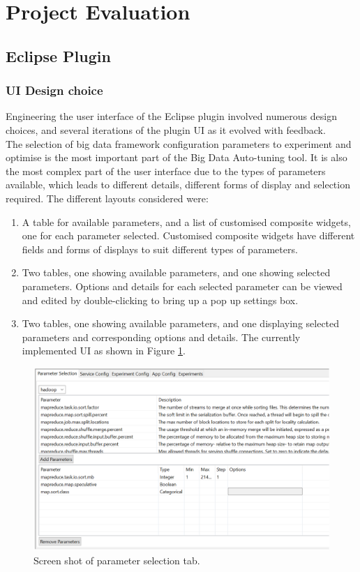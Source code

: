 \newpage
\section{Project Evaluation}
\subsection{Eclipse Plugin}
\subsubsection{UI Design choice}
Engineering the user interface of the Eclipse plugin involved numerous design choices, and several iterations of the plugin UI as it evolved with feedback.\\
The selection of big data framework configuration parameters to experiment and optimise is the most important part of the Big Data Auto-tuning tool. It is also the most complex part of the user interface due to the types of parameters available, which leads to different details, different forms of display and selection required. The different layouts considered were:
\begin{enumerate}
\item A table for available parameters, and a list of customised composite widgets, one for each parameter selected. Customised composite widgets have different fields and forms of displays to suit different types of parameters.
\item Two tables, one showing available parameters, and one showing selected parameters. Options and details for each selected parameter can be viewed and edited by double-clicking to bring up a pop up settings box.
\item Two tables, one showing available parameters, and one displaying selected parameters and corresponding options and details. The currently implemented UI as shown in Figure \ref{fig:param}.
\end{enumerate}
\begin{figure}[h]
\centering
\caption{Screen shot of parameter selection tab.}
\label{fig:param}
\includegraphics[width=\textwidth]{images/param.png}
\end{figure}
